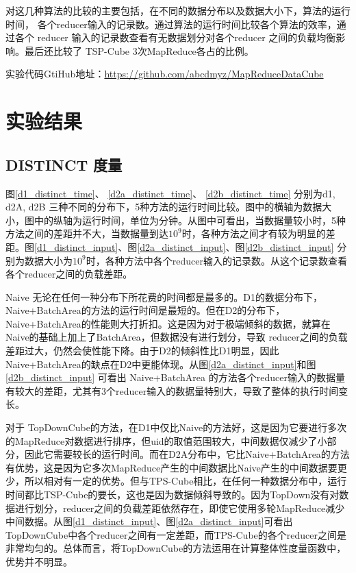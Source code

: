 对这几种算法的比较的主要包括，在不同的数据分布以及数据大小下，算法的运行时间， 各个reducer输入的记录数。通过算法的运行时间比较各个算法的效率，通过各个 reducer 输入的记录数查看有无数据划分对各个reducer 之间的负载均衡影响。最后还比较了 TSP-Cube 3次MapReduce各占的比例。

实验代码GtiHub地址：\url{https://github.com/abcdmyz/MapReduceDataCube}

\section{实验结果}

\subsection{DISTINCT 度量}


图\ref{d1_distinct_time}、 \ref{d2a_distinct_time}、 \ref{d2b_distinct_time} 分别为d1, d2A, d2B 三种不同的分布下，5种方法的运行时间比较。图中的横轴为数据大小，图中的纵轴为运行时间，单位为分钟。从图中可看出，当数据量较小时，5种方法之间的差距并不大，当数据量到达${10}^{9}$时，各种方法之间才有较为明显的差距。图\ref{d1_distinct_input}、图\ref{d2a_distinct_input}、图\ref{d2b_distinct_input} 分别为数据大小为${10}^{9}$时，各种方法中各个reducer输入的记录数。从这个记录数查看各个reducer之间的负载差距。

Naive 无论在任何一种分布下所花费的时间都是最多的。D1的数据分布下，Naive+BatchArea的方法的运行时间是最短的。但在D2的分布下，Naive+BatchArea的性能则大打折扣。这是因为对于极端倾斜的数据，就算在Naive的基础上加上了BatchArea，但数据没有进行划分，导致 reducer之间的负载差距过大，仍然会使性能下降。由于D2的倾斜性比D1明显，因此Naive+BatchArea的缺点在D2中更能体现。从图\ref{d2a_distinct_input}和图\ref{d2b_distinct_input} 可看出 Naive+BatchArea 的方法各个reducer输入的数据量有较大的差距，尤其有3个reducer输入的数据量特别大，导致了整体的执行时间变长。

对于 TopDownCube的方法，在D1中仅比Naive的方法好，这是因为它要进行多次的MapReduce对数据进行排序，但uid的取值范围较大，中间数据仅减少了小部分，因此它需要较长的运行时间。而在D2A分布中，它比Naive+BatchArea的方法有优势，这是因为它多次MapReduce产生的中间数据比Naive产生的中间数据要更少，所以相对有一定的优势。但与TPS-Cube相比，在任何一种数据分布中，运行时间都比TSP-Cube的要长，这也是因为数据倾斜导致的。因为TopDown没有对数据进行划分，reducer之间的负载差距依然存在，即使它使用多轮MapReduce减少中间数据。从图\ref{d1_distinct_input}、图\ref{d2a_distinct_input}可看出TopDownCube中各个reducer之间有一定差距，而TPS-Cube的各个reducer之间是非常均匀的。总体而言，将TopDownCube的方法运用在计算整体性度量函数中，优势并不明显。

